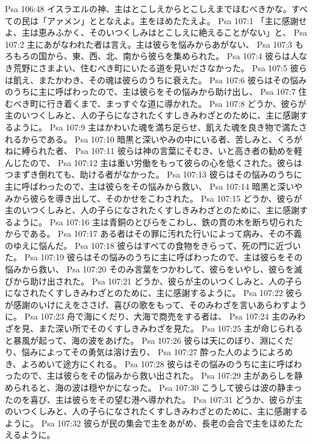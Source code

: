Psa 106:48  イスラエルの神、主はとこしえからとこしえまでほむべきかな。すべての民は「アァメン」ととなえよ。主をほめたたえよ。
Psa 107:1  「主に感謝せよ、主は恵みふかく、そのいつくしみはとこしえに絶えることがない」と、
Psa 107:2  主にあがなわれた者は言え。主は彼らを悩みからあがない、
Psa 107:3  もろもろの国から、東、西、北、南から彼らを集められた。
Psa 107:4  彼らは人なき荒野にさまよい、住むべき町にいたる道を見いださなかった。
Psa 107:5  彼らは飢え、またかわき、その魂は彼らのうちに衰えた。
Psa 107:6  彼らはその悩みのうちに主に呼ばわったので、主は彼らをその悩みから助け出し、
Psa 107:7  住むべき町に行き着くまで、まっすぐな道に導かれた。
Psa 107:8  どうか、彼らが主のいつくしみと、人の子らになされたくすしきみわざとのために、主に感謝するように。
Psa 107:9  主はかわいた魂を満ち足らせ、飢えた魂を良き物で満たされるからである。
Psa 107:10  暗黒と深いやみの中にいる者、苦しみと、くろがねに縛られた者、
Psa 107:11  彼らは神の言葉にそむき、いと高き者の勧めを軽んじたので、
Psa 107:12  主は重い労働をもって彼らの心を低くされた。彼らはつまずき倒れても、助ける者がなかった。
Psa 107:13  彼らはその悩みのうちに主に呼ばわったので、主は彼らをその悩みから救い、
Psa 107:14  暗黒と深いやみから彼らを導き出して、そのかせをこわされた。
Psa 107:15  どうか、彼らが主のいつくしみと、人の子らになされたくすしきみわざとのために、主に感謝するように。
Psa 107:16  主は青銅のとびらをこわし、鉄の貫の木を断ち切られたからである。
Psa 107:17  ある者はその罪に汚れた行いによって病み、その不義のゆえに悩んだ。
Psa 107:18  彼らはすべての食物をきらって、死の門に近づいた。
Psa 107:19  彼らはその悩みのうちに主に呼ばわったので、主は彼らをその悩みから救い、
Psa 107:20  そのみ言葉をつかわして、彼らをいやし、彼らを滅びから助け出された。
Psa 107:21  どうか、彼らが主のいつくしみと、人の子らになされたくすしきみわざとのために、主に感謝するように。
Psa 107:22  彼らが感謝のいけにえをささげ、喜びの歌をもって、そのみわざを言いあらわすように。
Psa 107:23  舟で海にくだり、大海で商売をする者は、
Psa 107:24  主のみわざを見、また深い所でそのくすしきみわざを見た。
Psa 107:25  主が命じられると暴風が起って、海の波をあげた。
Psa 107:26  彼らは天にのぼり、淵にくだり、悩みによってその勇気は溶け去り、
Psa 107:27  酔った人のようによろめき、よろめいて途方にくれる。
Psa 107:28  彼らはその悩みのうちに主に呼ばわったので、主は彼らをその悩みから救い出された。
Psa 107:29  主があらしを静められると、海の波は穏やかになった。
Psa 107:30  こうして彼らは波の静まったのを喜び、主は彼らをその望む港へ導かれた。
Psa 107:31  どうか、彼らが主のいつくしみと、人の子らになされたくすしきみわざとのために、主に感謝するように。
Psa 107:32  彼らが民の集会で主をあがめ、長老の会合で主をほめたたえるように。
